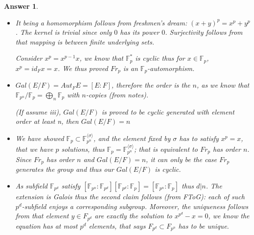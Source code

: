 \documentclass[11pt,leqno]{article}
\newcommand{\F}{{\mathbb F}}
\newcommand{\<}[1]{{\langle}#1 {\rangle}}
\newcommand{\F}{{\mathcal F}}
\theoremstyle{plain}
\newtheorem*{answer*}{Answer}
\theoremstyle{definition}
\theoremstyle{remark}
\numberwithin{equation}{section}
\begin{document}
\begin{enumerate}
\begin{answer*}
\begin{itemize}
            \item [i)] It being a homomorphism follows from freshmen's dream: $(x+y)^p=x^p+y^p$. The kernel is trivial since only $0$ has its power $0$. Surjectivity follows from that mapping is between finite underlying sets.
            
            Consider $x^p=x^{p-1}x$, we know that $\F_p^*$ is cyclic thus for $x\in \F_p$, $x^p=id_Fx=x$. We thus proved $Fr_p$ is an $\F_p$-automorphism.
            
            \item [ii)] $Gal(E/F)=Aut_F E=[E:F]$, therefore the order is the $n$, as
            we know that $\F_{p^n}/\F_{p}=\bigoplus_n {\F_p}$ with $n$-copies (from notes). 
            
            (If assume iii), $Gal(E/F)$ is proved to be cyclic generated with element order at least n, then $Gal(E/F)=n$
            
            \item [iii)]  
            
            We have showed $\F_p \subset \F_{p^n}^{\langle \sigma \rangle}$, and the element fixed by $\sigma$ has to satisfy $x^p=x$, that we have $p$ solutions, thus $\F_p = \F_{p^n}^{\langle \sigma \rangle}$; that is equivalent to $Fr_p$ has order $n$.  Since $Fr_p$ has order $n$ and $Gal(E/F)=n$, it can only be the case $Fr_p$ generates the group and thus our $Gal(E/F)$ is cyclic.
            
            \item [iv)] As subfield $\F_{p^d}$ satisfy $[\F_{p^n}:\F_{p^d}][\F_{p^d}:\F_{p}]=[\F_{p^n}:\F_{p}]$ thus $d|n$. The extension is Galois thus the second claim follows (from FToG): each of such $p^d$-subfield enjoys a corresponding subgroup. Moreover, the uniqueness follows from that element $y\in F_{p^d}$ are exactly the solution to $x^{p^d}-x=0$, we know the equation has at most $p^d$ elements, that says $F_{p^d}\subset F_{p^n}$ has to be unique.
            
        \end{itemize}
    \end{answer*}
    


\end{enumerate}
\end{document}
